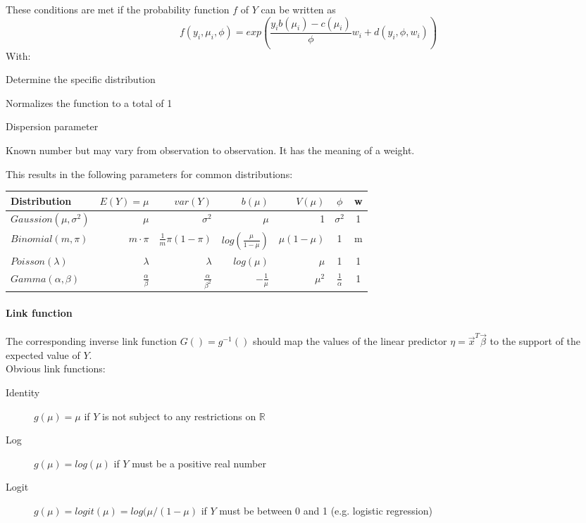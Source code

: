 These conditions are met if the probability function $f$ of $Y$ can be written as
\begin{equation*}
f(y_i, \mu_i, \phi) = exp(\frac{y_i b(\mu_i)-c(\mu_i)}{\phi}w_i+d(y_i, \phi, w_i))
\end{equation*}
With:
\begin{description}
	\tightlist
	\item[$b()$ and $c()$] Determine the specific distribution
	\item[$d()$] Normalizes the function to a total of 1
	\item[$\phi$] Dispersion parameter
	\item[$w_i$] Known number but may vary from observation to observation.	It has the meaning of a weight.
\end{description}

This results in the following parameters for common distributions:

\begin{tabular}{l||rr|rrcc}
	\hline 
	Distribution & $E(Y) = \mu$ & $var(Y)$ & $b(\mu)$ & $V(\mu)$ & $\phi$ & w \\
	\hline
	$Gaussion(\mu, \sigma^2)$ & $\mu$ & $\sigma^2$ & $\mu$ & 1 & $\sigma^2$ & 1\\
	$Binomial(m, \pi)$ & $m\cdot\pi$ & $\frac{1}{m}\pi(1-\pi)$ & $log(\frac{\mu}{1-\mu})$ & $\mu(1-\mu)$ & 1 & m\\
	$Poisson(\lambda)$ & $\lambda$ & $\lambda$ & $log(\mu)$ & $\mu$ & 1 & 1\\
	$Gamma(\alpha, \beta)$ & $\frac{\alpha}{\beta}$ & $\frac{\alpha}{\beta^2}$ & $-\frac{1}{\mu}$ & $\mu^2$ & $\frac{1}{\alpha}$ & 1\\
	\hline
\end{tabular}

\paragraph{Link function}
The corresponding inverse link function $G() = g^{-1}()$ should map the values of the linear predictor $\eta = \vec{x}^T \vec{\beta}$ to the support of the expected value of $Y$.\\
Obvious link functions:
\begin{description}
	\item[Identity] $g(\mu) = \mu$ if $Y$ is not subject to any restrictions on $\mathbb{R}$
	\item[Log] $g(\mu) = log(\mu)$ if $Y$ must be a positive real number
	\item[Logit] $g(\mu) = logit(\mu)=log(\mu/(1-\mu)$ if $Y$ must be between 0 and 1 (e.g. logistic regression)
\end{description}

